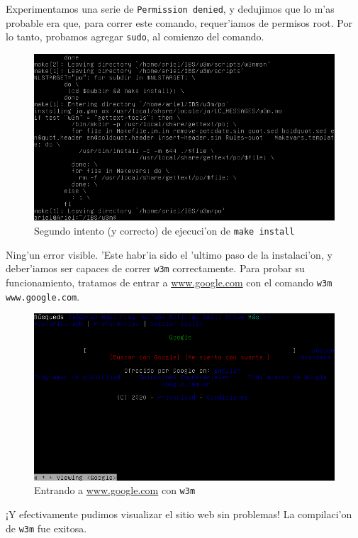 \documentclass[11pt]{article}
\begin{document}
		Experimentamos una serie de \texttt{Permission denied}, y dedujimos que lo m'as probable era que, para correr este comando, requer'iamos de permisos root. Por lo tanto, probamos agregar \texttt{sudo}, al comienzo del comando.
		
		\begin{figure}[H]
			\centering \captionsetup{justification=centering}
			\includegraphics[width=.8\linewidth]{Images/Compile_w3m/make-install_successful}
			\caption{Segundo intento (y correcto) de ejecuci'on de \texttt{make install}}
			\label{fig:make-install_successful}
		\end{figure}
		
		Ning'un error visible. 'Este habr'ia sido el 'ultimo paso de la instalaci'on, y deber'iamos ser capaces de correr \texttt{w3m} correctamente. Para probar su funcionamiento, tratamos de entrar a \url{www.google.com} con el comando \texttt{w3m www.google.com}.
		
		\begin{figure}[H]
			\centering \captionsetup{justification=centering}
			\includegraphics[width=.8\linewidth]{Images/Compile_w3m/test_w3m}
			\caption{Entrando a \url{www.google.com} con \texttt{w3m}}
			\label{fig:test_w3m}
		\end{figure}
		
		¡Y efectivamente pudimos visualizar el sitio web sin problemas! La compilaci'on de \texttt{w3m} fue exitosa.
		
\end{document}
